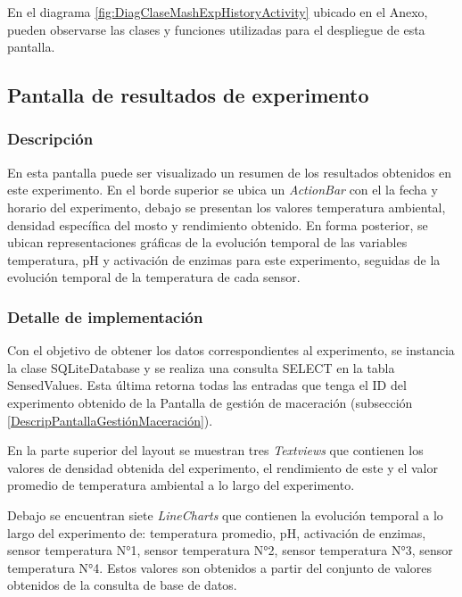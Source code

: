            
            \par En el diagrama \ref{fig:DiagClaseMashExpHistoryActivity} ubicado en el Anexo, pueden observarse las clases y funciones utilizadas para el despliegue de esta pantalla.
            
        
        \subsection{Pantalla de resultados de experimento}
        \label{DescripPantallaResultadosExperimento}
            \subsubsection{Descripción}
            En esta pantalla puede ser visualizado un resumen de los resultados obtenidos en este experimento.
            En el borde superior se ubica un \textit{ActionBar} con el la fecha y horario del experimento, debajo se presentan los valores temperatura ambiental, densidad específica del mosto y rendimiento obtenido. En forma posterior, se ubican representaciones gráficas de la evolución temporal de las variables temperatura, pH y activación de enzimas para este experimento, seguidas de la evolución temporal de la temperatura de cada sensor.
            
            \subsubsection{Detalle de implementación}
            
            \par Con el objetivo de obtener los datos correspondientes al experimento, se instancia la clase SQLiteDatabase y se realiza una consulta SELECT en la tabla SensedValues. Esta última retorna todas las entradas que tenga el ID del experimento obtenido de la Pantalla de gestión de maceración (subsección \ref{DescripPantallaGestiónMaceración}).
            
            \par En la parte superior del layout se muestran tres \textit{Textviews} que contienen los valores de densidad obtenida del experimento, el rendimiento de este y el valor promedio de temperatura ambiental a lo largo del experimento. 
            
            \par Debajo se encuentran siete \textit{LineCharts} que contienen la evolución temporal a lo largo del experimento de: temperatura promedio, pH, activación de enzimas, sensor temperatura N°1, sensor temperatura N°2, sensor temperatura N°3, sensor temperatura N°4. Estos valores son obtenidos a partir del conjunto de valores obtenidos de la consulta de base de datos.
            
